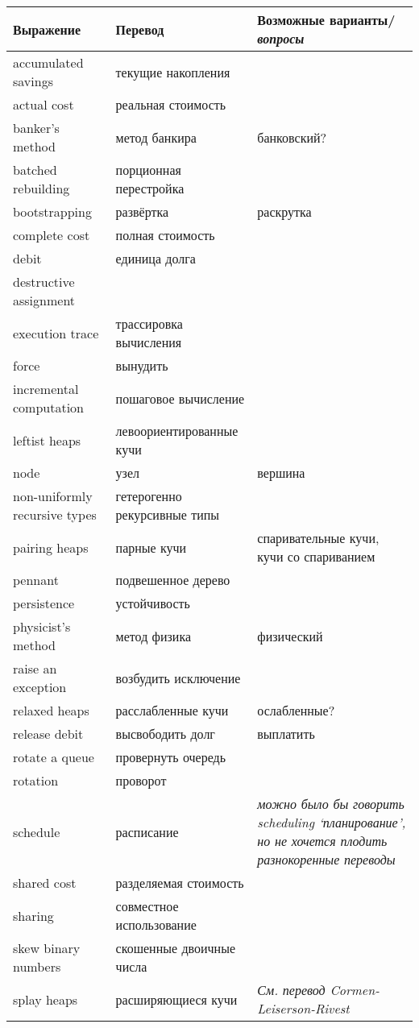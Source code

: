 \documentclass{article}
\begin{document}
\begin{tabular}{p{3cm}|p{4cm}|p{5cm}}
Выражение & Перевод & Возможные варианты/\textit{вопросы} \\
\hline
accumulated savings & текущие накопления \\
actual cost & реальная стоимость \\
banker's method & метод банкира & банковский? \\
batched rebuilding & порционная перестройка \\
bootstrapping & развёртка & раскрутка \\
complete cost & полная стоимость \\
debit & единица долга \\
destructive assignment & \\
execution trace & трассировка вычисления \\
force & вынудить \\
incremental computation & пошаговое вычисление \\
leftist heaps & левоориентированные кучи \\
node & узел & вершина \\
non-uniformly recursive types & гетерогенно рекурсивные типы \\
pairing heaps & парные кучи & спаривательные кучи, кучи со спариванием
\\
pennant & подвешенное дерево \\
persistence & устойчивость \\
physicist's method & метод физика & физический \\
raise an exception & возбудить исключение \\
relaxed heaps & расслабленные кучи & ослабленные? \\
release debit & высвободить долг & выплатить \\
rotate a queue & провернуть очередь \\
rotation & проворот \\
schedule & расписание & \textit{можно было бы говорить
  \emph{scheduling} `планирование', но не хочется плодить
  разнокоренные переводы} \\
shared cost & разделяемая стоимость \\
sharing & совместное использование \\
skew binary numbers & скошенные двоичные числа \\
splay heaps & расширяющиеся кучи & \textit{См. перевод Cormen-Leiserson-Rivest}\\

\end{tabular}
\end{document}
